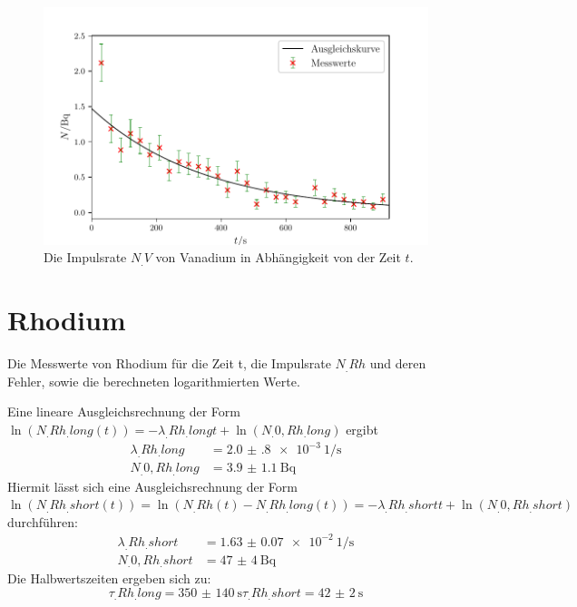 \begin{figure}
	\centering
	\includegraphics[width=\linewidth-50pt,height=\textheight-50pt,keepaspectratio]{content/images/Vanadium.pdf}
	\caption{Die Impulsrate $N_.V$ von Vanadium in Abhängigkeit von der Zeit $t$.}
	\label{fig:Vanadium}
\end{figure}


\section{Rhodium}

\begin{table}
	\centering
	\caption{Die Messwerte von Rhodium für die Zeit t, die Impulsrate $N_.{Rh}$ und deren Fehler, sowie die berechneten logarithmierten Werte.}
	
	\label{tab:tabRhodium1}
\end{table}

\begin{table}
	\centering
	
\end{table}

Eine lineare Ausgleichsrechnung der Form $\ln(N_.{Rh_.{long}}(t))=-\lambda_.{Rh_.{long}} t+\ln(N_.{0,Rh_.{long}})$ ergibt
\begin{align*}
\lambda_.{Rh_.{long}} 	&= \SI{2.0(8)e-3}{1\per\second}\\
N_.{0,Rh_.{long}} 		&= \SI{3.9(11)}{\becquerel}
\end{align*}
Hiermit lässt sich eine Ausgleichsrechnung der Form $\ln(N_.{Rh_.{short}}(t))=\ln(N_.{Rh}(t)-N_.{Rh_.{long}}(t))=-\lambda_.{Rh_.{short}} t+\ln(N_.{0,Rh_.{short}})$ durchführen:
\begin{align*}
\lambda_.{Rh_.{short}} 	&= \SI{1.63(7)e-2}{1\per\second}\\
N_.{0,Rh_.{short}} 		&= \SI{47(4)}{\becquerel}
\end{align*}
Die Halbwertszeiten ergeben sich zu:
\begin{equation*}
\tau_.{Rh_.{long}} = \SI{350(140)}{\second}
\tau_.{Rh_.{short}} = \SI{42(2)}{\second}
\end{equation*}

